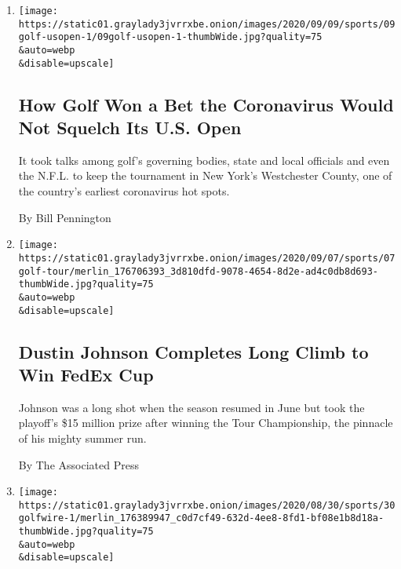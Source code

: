 \begin{enumerate}
\def\labelenumi{\arabic{enumi}.}
\item
  \href{/2020/09/09/sports/golf/usopen-westchester-coronavirus.html}{}

  \texttt{[image: https://static01.graylady3jvrrxbe.onion/images/2020/09/09/sports/09golf-usopen-1/09golf-usopen-1-thumbWide.jpg?quality=75\\\&auto=webp\\\&disable=upscale]}

  \hypertarget{how-golf-won-a-bet-the-coronavirus-would-not-squelch-its-us-open}{%
  \subsection{How Golf Won a Bet the Coronavirus Would Not Squelch Its
  U.S.
  Open}\label{how-golf-won-a-bet-the-coronavirus-would-not-squelch-its-us-open}}

  It took talks among golf's governing bodies, state and local officials
  and even the N.F.L. to keep the tournament in New York's Westchester
  County, one of the country's earliest coronavirus hot spots.

  By Bill Pennington
\item
  \href{/2020/09/07/sports/golf/dustin-johnson-fedex-cup-tour-championship.html}{}

  \texttt{[image: https://static01.graylady3jvrrxbe.onion/images/2020/09/07/sports/07golf-tour/merlin\_176706393\_3d810dfd-9078-4654-8d2e-ad4c0db8d693-thumbWide.jpg?quality=75\\\&auto=webp\\\&disable=upscale]}

  \hypertarget{dustin-johnson-completes-long-climb-to-win-fedex-cup}{%
  \subsection{Dustin Johnson Completes Long Climb to Win FedEx
  Cup}\label{dustin-johnson-completes-long-climb-to-win-fedex-cup}}

  Johnson was a long shot when the season resumed in June but took the
  playoff's \$15 million prize after winning the Tour Championship, the
  pinnacle of his mighty summer run.

  By The Associated Press
\item
  \href{/2020/08/30/sports/golf/jon-rahm-bmw-championship.html}{}

  \texttt{[image: https://static01.graylady3jvrrxbe.onion/images/2020/08/30/sports/30golfwire-1/merlin\_176389947\_c0d7cf49-632d-4ee8-8fd1-bf08e1b8d18a-thumbWide.jpg?quality=75\\\&auto=webp\\\&disable=upscale]}


\end{enumerate}

